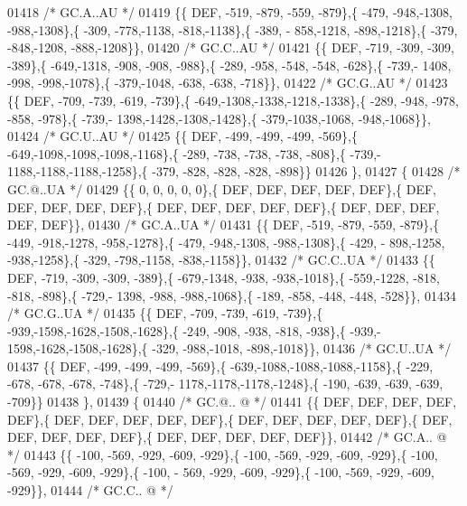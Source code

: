 \begin{DoxyCode}
01418 \textcolor{comment}{/* GC.A..AU */}
01419 \{\{  DEF, -519, -879, -559, -879\},\{ -479, -948,-1308, -988,-1308\},\{ -309, -778,-1138, -818,-1138\},\{ -389, -
      858,-1218, -898,-1218\},\{ -379, -848,-1208, -888,-1208\}\},
01420 \textcolor{comment}{/* GC.C..AU */}
01421 \{\{  DEF, -719, -309, -309, -389\},\{ -649,-1318, -908, -908, -988\},\{ -289, -958, -548, -548, -628\},\{ -739,-
      1408, -998, -998,-1078\},\{ -379,-1048, -638, -638, -718\}\},
01422 \textcolor{comment}{/* GC.G..AU */}
01423 \{\{  DEF, -709, -739, -619, -739\},\{ -649,-1308,-1338,-1218,-1338\},\{ -289, -948, -978, -858, -978\},\{ -739,-
      1398,-1428,-1308,-1428\},\{ -379,-1038,-1068, -948,-1068\}\},
01424 \textcolor{comment}{/* GC.U..AU */}
01425 \{\{  DEF, -499, -499, -499, -569\},\{ -649,-1098,-1098,-1098,-1168\},\{ -289, -738, -738, -738, -808\},\{ -739,-
      1188,-1188,-1188,-1258\},\{ -379, -828, -828, -828, -898\}\}
01426 \},
01427 \{
01428 \textcolor{comment}{/* GC.@..UA */}
01429 \{\{    0,    0,    0,    0,    0\},\{  DEF,  DEF,  DEF,  DEF,  DEF\},\{  DEF,  DEF,  DEF,  DEF,  DEF\},\{  DEF,  
      DEF,  DEF,  DEF,  DEF\},\{  DEF,  DEF,  DEF,  DEF,  DEF\}\},
01430 \textcolor{comment}{/* GC.A..UA */}
01431 \{\{  DEF, -519, -879, -559, -879\},\{ -449, -918,-1278, -958,-1278\},\{ -479, -948,-1308, -988,-1308\},\{ -429, -
      898,-1258, -938,-1258\},\{ -329, -798,-1158, -838,-1158\}\},
01432 \textcolor{comment}{/* GC.C..UA */}
01433 \{\{  DEF, -719, -309, -309, -389\},\{ -679,-1348, -938, -938,-1018\},\{ -559,-1228, -818, -818, -898\},\{ -729,-
      1398, -988, -988,-1068\},\{ -189, -858, -448, -448, -528\}\},
01434 \textcolor{comment}{/* GC.G..UA */}
01435 \{\{  DEF, -709, -739, -619, -739\},\{ -939,-1598,-1628,-1508,-1628\},\{ -249, -908, -938, -818, -938\},\{ -939,-
      1598,-1628,-1508,-1628\},\{ -329, -988,-1018, -898,-1018\}\},
01436 \textcolor{comment}{/* GC.U..UA */}
01437 \{\{  DEF, -499, -499, -499, -569\},\{ -639,-1088,-1088,-1088,-1158\},\{ -229, -678, -678, -678, -748\},\{ -729,-
      1178,-1178,-1178,-1248\},\{ -190, -639, -639, -639, -709\}\}
01438 \},
01439 \{
01440 \textcolor{comment}{/* GC.@.. @ */}
01441 \{\{  DEF,  DEF,  DEF,  DEF,  DEF\},\{  DEF,  DEF,  DEF,  DEF,  DEF\},\{  DEF,  DEF,  DEF,  DEF,  DEF\},\{  DEF,  
      DEF,  DEF,  DEF,  DEF\},\{  DEF,  DEF,  DEF,  DEF,  DEF\}\},
01442 \textcolor{comment}{/* GC.A.. @ */}
01443 \{\{ -100, -569, -929, -609, -929\},\{ -100, -569, -929, -609, -929\},\{ -100, -569, -929, -609, -929\},\{ -100, -
      569, -929, -609, -929\},\{ -100, -569, -929, -609, -929\}\},
01444 \textcolor{comment}{/* GC.C.. @ */}

\end{DoxyCode}

